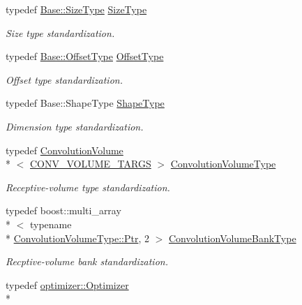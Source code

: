 \begin{DoxyCompactItemize}
typedef \hyperlink{classffnn_1_1layer_1_1_hidden_a3deb1dc4b3a83b3d6749474debee025f}{Base\-::\-Size\-Type} \hyperlink{classffnn_1_1layer_1_1_convolution_ab0f68575e459597264bbe4451a6299bd}{Size\-Type}
\begin{DoxyCompactList}\small\item\em Size type standardization. \end{DoxyCompactList}\item 
typedef \hyperlink{classffnn_1_1layer_1_1_hidden_a4a191bc002b2545231a3d80c99004693}{Base\-::\-Offset\-Type} \hyperlink{classffnn_1_1layer_1_1_convolution_af3cbd4933c8bad5f58fc00d3ac1d33a5}{Offset\-Type}
\begin{DoxyCompactList}\small\item\em Offset type standardization. \end{DoxyCompactList}\item 
typedef Base\-::\-Shape\-Type \hyperlink{classffnn_1_1layer_1_1_convolution_a94fd4842bb6fd40c64b4aa52a39f450a}{Shape\-Type}
\begin{DoxyCompactList}\small\item\em Dimension type standardization. \end{DoxyCompactList}\item 
typedef \hyperlink{classffnn_1_1layer_1_1_convolution_volume}{Convolution\-Volume}\\*
$<$ \hyperlink{convolution_8h_a054b25d3efc67e1baaedfbc7305f8f50}{C\-O\-N\-V\-\_\-\-V\-O\-L\-U\-M\-E\-\_\-\-T\-A\-R\-G\-S} $>$ \hyperlink{classffnn_1_1layer_1_1_convolution_a7513a4676d627e4310b1ea582b73e7eb}{Convolution\-Volume\-Type}
\begin{DoxyCompactList}\small\item\em Receptive-\/volume type standardization. \end{DoxyCompactList}\item 
typedef boost\-::multi\-\_\-array\\*
$<$ typename \\*
\hyperlink{classffnn_1_1layer_1_1_convolution_volume_a34fd376bc786013ed79837acafae0645}{Convolution\-Volume\-Type\-::\-Ptr}, 2 $>$ \hyperlink{classffnn_1_1layer_1_1_convolution_ab9d4759c7f52bcd098fb88382cc450a3}{Convolution\-Volume\-Bank\-Type}
\begin{DoxyCompactList}\small\item\em Recptive-\/volume bank standardization. \end{DoxyCompactList}\item 
typedef \hyperlink{classffnn_1_1optimizer_1_1_optimizer}{optimizer\-::\-Optimizer}\\*

\end{DoxyCompactItemize}
